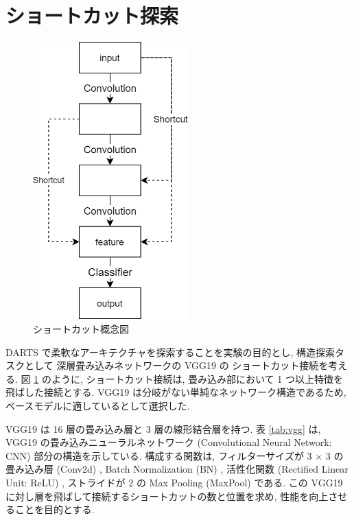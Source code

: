 \newpage
\changeindent{0cm}
\section{ショートカット探索}
\label{sec:pred}
\changeindent{2cm}

\begin{figure}[t]
  \begin{center}
    \includegraphics[clip,width=6cm]{./fig/03.pred/image.png}
  \end{center}
  \caption{ショートカット概念図}
  \label{fig:image}
\end{figure}

DARTS で柔軟なアーキテクチャを探索することを実験の目的とし, 構造探索タスクとして
深層畳み込みネットワークの VGG19\cite{Simonyan15} の
ショートカット接続\cite{mao2016image}を考える.
図 \ref{fig:image} のように, ショートカット接続は,
畳み込み部において 1 つ以上特徴を飛ばした接続とする.
VGG19 は分岐がない単純なネットワーク構造であるため, ベースモデルに適しているとして選択した.

VGG19 は 16 層の畳み込み層と 3 層の線形結合層を持つ.
表 \ref{tab:vgg} は, VGG19 の畳み込みニューラルネットワーク
(Convolutional Neural Network: CNN) 部分の構造を示している.
構成する関数は, フィルターサイズが 3 $\times$ 3 の畳み込み層 (Conv2d) ,
Batch Normalization (BN)\cite{Ioffe2015BatchNA} ,
活性化関数 (Rectified Linear Unit: ReLU) ,
ストライドが 2 の Max Pooling (MaxPool) である.
この VGG19 に対し層を飛ばして接続するショートカットの数と位置を求め,
性能を向上させることを目的とする.

